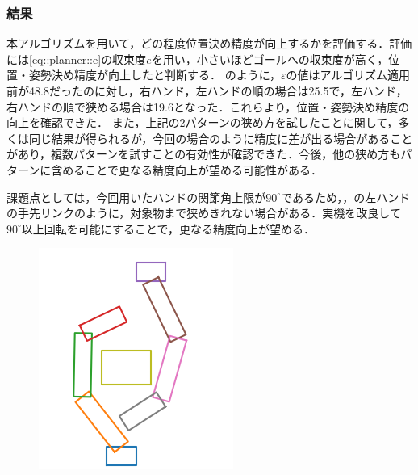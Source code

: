 \documentclass[a4paper,twoside,12pt,papersize, dvipdfmx]{iirthesis}
\begin{document}
{\subsubsection{結果}
本アルゴリズムを用いて，どの程度位置決め精度が向上するかを評価する．評価には\eqref{eq::planner::e}の収束度$e$を用い，小さいほどゴールへの収束度が高く，位置・姿勢決め精度が向上したと判断する．
のように，$\varepsilon$の値はアルゴリズム適用前が48.8だったのに対し，右ハンド，左ハンドの順の場合は25.5で，左ハンド，右ハンドの順で狭める場合は19.6となった．これらより，位置・姿勢決め精度の向上を確認できた．
また，上記の2パターンの狭め方を試したことに関して，多くは同じ結果が得られるが，今回の場合のように精度に差が出る場合があることがあり，複数パターンを試すことの有効性が確認できた．今後，他の狭め方もパターンに含めることで更なる精度向上が望める可能性がある．　\par
課題点としては，今回用いたハンドの関節角上限が$90^{\circ}$であるため，，の左ハンドの手先リンクのように，対象物まで狭めきれない場合がある．実機を改良して$90^{\circ}$以上回転を可能にすることで，更なる精度向上が望める．
\begin{figure}[b]
\centering
\begin{minipage}{0.33\hsize}
\includegraphics[width=0.9\hsize]{fig/3-new-planner/rec_before_FC.png}

\end{minipage}
\end{figure}}
\end{document}
